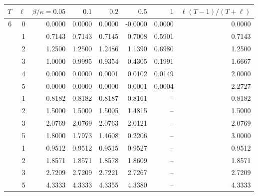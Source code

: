 \begin{tabular}{rrrrrrrr}
\toprule
$T$ & $\ell$ & $\beta/\kappa=0.05$ & $0.1$ & $0.2$ & $0.5$ & $1$ & $\ell(T-1)/(T+\ell)$\\
\midrule
6 & 0 & 0.0000 & 0.0000 & 0.0000 & -0.0000 & 0.0000 & 0.0000\\
 & 1 & 0.7143 & 0.7143 & 0.7145 & 0.7008 & 0.5901 & 0.7143\\
 & 2 & 1.2500 & 1.2500 & 1.2486 & 1.1390 & 0.6980 & 1.2500\\
 & 3 & 1.0000 & 0.9995 & 0.9354 & 0.4305 & 0.1991 & 1.6667\\
 & 4 & 0.0000 & 0.0000 & 0.0001 & 0.0102 & 0.0149 & 2.0000\\
 & 5 & 0.0000 & 0.0000 & 0.0000 & 0.0001 & 0.0004 & 2.2727\\
\addlinespace
10 & 1 & 0.8182 & 0.8182 & 0.8187 & 0.8161 & -- & 0.8182\\
 & 2 & 1.5000 & 1.5000 & 1.5005 & 1.4815 & -- & 1.5000\\
 & 3 & 2.0769 & 2.0769 & 2.0763 & 2.0121 & -- & 2.0769\\
 & 5 & 1.8000 & 1.7973 & 1.4608 & 0.2206 & -- & 3.0000\\
\addlinespace
40 & 1 & 0.9512 & 0.9512 & 0.9515 & 0.9527 & -- & 0.9512\\
 & 2 & 1.8571 & 1.8571 & 1.8578 & 1.8609 & -- & 1.8571\\
 & 3 & 2.7209 & 2.7209 & 2.7221 & 2.7267 & -- & 2.7209\\
 & 5 & 4.3333 & 4.3333 & 4.3355 & 4.3380 & -- & 4.3333\\
\bottomrule
\end{tabular}
